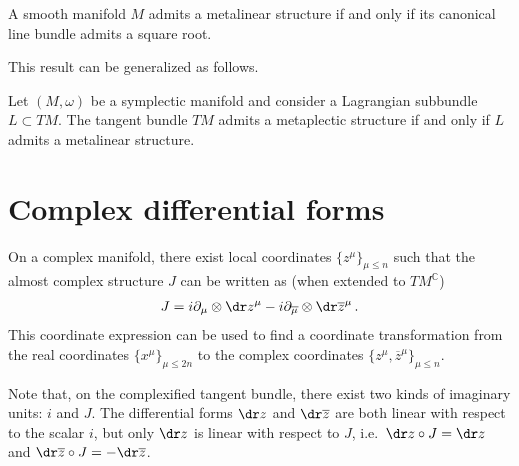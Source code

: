     \begin{result}
        A smooth manifold $M$ admits a metalinear structure if and only if its canonical line bundle admits a square root.
    \end{result}
    This result can be generalized as follows.

    \begin{property}\label{complex:metaplectic}
        Let $(M,\omega)$ be a symplectic manifold and consider a Lagrangian subbundle $L\subset TM$. The tangent bundle $TM$ admits a metaplectic structure if and only if $L$ admits a metalinear structure.
    \end{property}

\section{Complex differential forms}

    \begin{property}
        On a complex manifold, there exist local coordinates $\{z^\mu\}_{\mu\leq n}$ such that the almost complex structure $J$ can be written as (when extended to $TM^{\mathbb{C}}$)
        \begin{gather}
            \label{complex:complex_structure}
            J = i\partial_\mu\otimes\dr z^\mu - i\partial_{\overline\mu}\otimes\dr\overline{z}^\mu\,.
        \end{gather}
        This coordinate expression can be used to find a coordinate transformation from the real coordinates $\{x^\mu\}_{\mu\leq2n}$ to the complex coordinates $\{z^\mu,\overline{z}^\mu\}_{\mu\leq n}$.
    \end{property}
    \begin{remark}
        Note that, on the complexified tangent bundle, there exist two kinds of imaginary units: $i$ and $J$. The differential forms $\dr z$ and $\dr\overline{z}$ are both linear with respect to the scalar $i$, but only $\dr z$ is linear with respect to $J$, i.e.~$\dr z\circ J=\dr z$ and $\dr\overline{z}\circ J=-\dr\overline{z}$.
    \end{remark}

